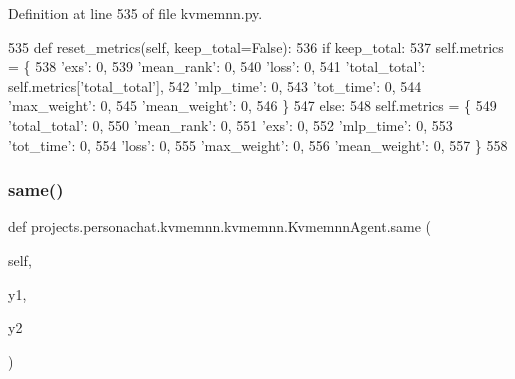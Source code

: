 Definition at line 535 of file kvmemnn.\+py.


\begin{DoxyCode}
535     \textcolor{keyword}{def }reset\_metrics(self, keep\_total=False):
536         \textcolor{keywordflow}{if} keep\_total:
537             self.metrics = \{
538                 \textcolor{stringliteral}{'exs'}: 0,
539                 \textcolor{stringliteral}{'mean\_rank'}: 0,
540                 \textcolor{stringliteral}{'loss'}: 0,
541                 \textcolor{stringliteral}{'total\_total'}: self.metrics[\textcolor{stringliteral}{'total\_total'}],
542                 \textcolor{stringliteral}{'mlp\_time'}: 0,
543                 \textcolor{stringliteral}{'tot\_time'}: 0,
544                 \textcolor{stringliteral}{'max\_weight'}: 0,
545                 \textcolor{stringliteral}{'mean\_weight'}: 0,
546             \}
547         \textcolor{keywordflow}{else}:
548             self.metrics = \{
549                 \textcolor{stringliteral}{'total\_total'}: 0,
550                 \textcolor{stringliteral}{'mean\_rank'}: 0,
551                 \textcolor{stringliteral}{'exs'}: 0,
552                 \textcolor{stringliteral}{'mlp\_time'}: 0,
553                 \textcolor{stringliteral}{'tot\_time'}: 0,
554                 \textcolor{stringliteral}{'loss'}: 0,
555                 \textcolor{stringliteral}{'max\_weight'}: 0,
556                 \textcolor{stringliteral}{'mean\_weight'}: 0,
557             \}
558 
\end{DoxyCode}
\mbox{\label{classprojects_1_1personachat_1_1kvmemnn_1_1kvmemnn_1_1KvmemnnAgent_a1b9834569393e1e53821567503fc6383}} 
\subsubsection{\texorpdfstring{same()}{same()}}
{\footnotesize\ttfamily def projects.\+personachat.\+kvmemnn.\+kvmemnn.\+Kvmemnn\+Agent.\+same (\begin{DoxyParamCaption}\item[{}]{self,  }\item[{}]{y1,  }\item[{}]{y2 }\end{DoxyParamCaption})}

